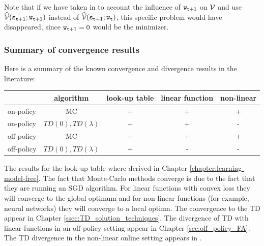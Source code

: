 Note that if we have taken in to account the influence of
${\tt w}_{{\tt t}+1}$ on $\mathcal{V}$ and use
$\widehat{\mathcal{V}}({\tt s}_{{\tt t}+1};{\tt w}_{{\tt t}+1})$ instead of
$\widehat{\mathcal{V}}({\tt s}_{{\tt t}+1};{\tt w}_{\tt t})$, this specific
problem would have disappeared, since ${\tt w}_{{\tt t}+1}=0$ would
be the minimizer.

\subsubsection{Summary of convergence results} Here is a summary of the known convergence and divergence results in
the literature:
\begin{center}
  \begin{tabular}{ | l | c | c|c|c| }
    \hline
    & algorithm & look-up table&linear function&non-linear\\ \hline
    on-policy & MC & + & + & + \\ \hline
    on-policy & $TD(0),TD(\lambda)$ & + & + & -\\ \hline
    off-policy & MC & + & + & + \\ \hline
    off-policy & $TD(0),TD(\lambda)$ & + & - & -\\ \hline
  \end{tabular}
\end{center}

The results for the look-up table where derived in Chapter
\ref{chapter:learning-model-free}.
%
The fact that Monte-Carlo methods converge is due to the fact that
they are running an SGD algorithm. For linear functions with convex
loss they will converge to the global optimum and for non-linear
functions (for example, neural networks) they will converge to a
local optima. The convergence to the TD appear in Chapter
\ref{ssec:TD_solution_techniques}. The divergence of TD with linear functions in
an off-policy setting appear in Chapter \ref{sec:off_policy_FA}. The TD
divergence in the non-linear online setting appears in
\cite{TsitsiklisVR97}.
